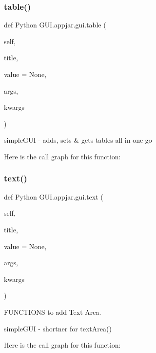 \begin{DoxyVerb}
\subsubsection{\texorpdfstring{table()}{table()}}
{\footnotesize\ttfamily def Python G\+U\+I.\+appjar.\+gui.\+table (\begin{DoxyParamCaption}\item[{}]{self,  }\item[{}]{title,  }\item[{}]{value = {\ttfamily None},  }\item[{}]{args,  }\item[{}]{kwargs }\end{DoxyParamCaption})}

\begin{DoxyVerb}simpleGUI - adds, sets & gets tables all in one go \end{DoxyVerb}
 Here is the call graph for this function\+:
\mbox{\label{class_python_01_g_u_i_1_1appjar_1_1gui_a6a060ddfec169e464326a0dd179a559e}} 
\subsubsection{\texorpdfstring{text()}{text()}}
{\footnotesize\ttfamily def Python G\+U\+I.\+appjar.\+gui.\+text (\begin{DoxyParamCaption}\item[{}]{self,  }\item[{}]{title,  }\item[{}]{value = {\ttfamily None},  }\item[{}]{args,  }\item[{}]{kwargs }\end{DoxyParamCaption})}



F\+U\+N\+C\+T\+I\+O\+NS to add Text Area. 

\begin{DoxyVerb}simpleGUI - shortner for textArea() \end{DoxyVerb}
 Here is the call graph for this function\+:
\mbox{\label{class_python_01_g_u_i_1_1appjar_1_1gui_ad290b6f726cd655f75322e10ef232c05}} 

\end{DoxyVerb}
